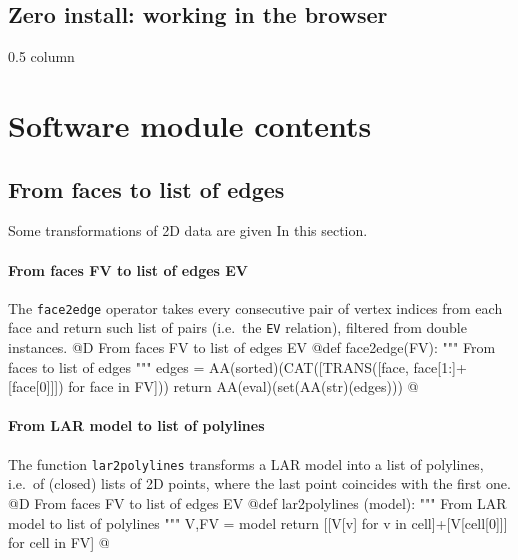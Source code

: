 \documentclass[11pt,oneside]{article}    %
\begin{document}
\subsection{Zero install: working in the browser}
0.5 column

\section{Software module contents}\label{sec:library}
\subsection{From faces to list of edges}

Some transformations of 2D data are given In this section. 

\paragraph{From faces FV to list of edges EV}
The \texttt{face2edge} operator takes every consecutive pair of vertex indices from each face and return such list of pairs (i.e.~the \texttt{EV} relation), filtered from double instances.
@D From faces FV to list of edges EV
@{def face2edge(FV):
    """ From faces to list of edges """
    edges = AA(sorted)(CAT([TRANS([face, face[1:]+[face[0]]]) for face in FV]))
    return AA(eval)(set(AA(str)(edges)))
@}

\paragraph{From LAR model to list of polylines}
The function \texttt{lar2polylines}
transforms a LAR model into a list of polylines, i.e.~of (closed) lists of 2D points, where the last point coincides with the first one.
@D From faces FV to list of edges EV
@{def lar2polylines (model):
    """ From LAR model to list of polylines """
    V,FV = model
    return [[V[v] for v in cell]+[V[cell[0]]] for cell in FV]
@}
\end{document}

